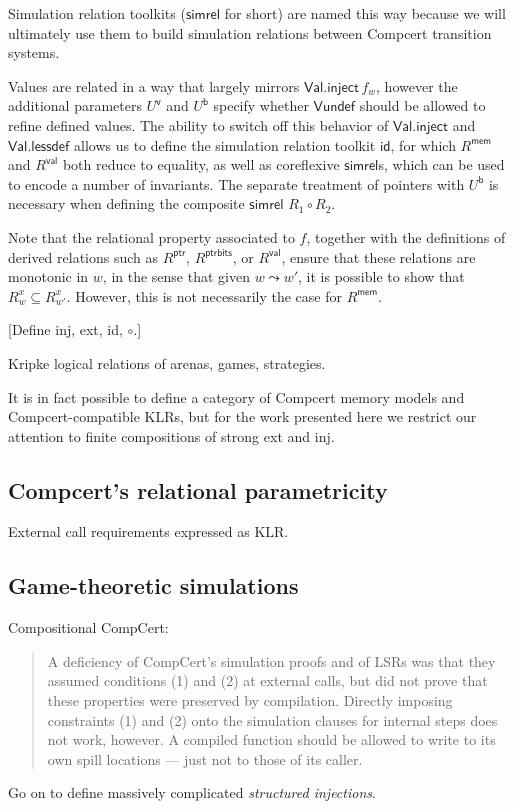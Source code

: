 \documentclass[acmsmall,anonymous,review]{acmart}
\newcommand{\kw}[1]{\ensuremath{ \textsf{#1} }}
\begin{document}
Simulation relation toolkits (\kw{simrel} for short)
are named this way because we will ultimately
use them to build simulation relations between
Compcert transition systems.

Values are related in a way that largely mirrors $\kw{Val.inject}\,f_w$,
however the additional parameters $U^\kw{v}$ and $U^\kw{b}$
specify whether $\kw{Vundef}$ should be allowed to refine defined values.
The ability to switch off this behavior of \kw{Val.inject} and \kw{Val.lessdef}
allows us to define the simulation relation toolkit \kw{id},
for which $R^\kw{mem}$ and $R^\kw{val}$ both reduce to equality,
as well as coreflexive \kw{simrel}s,
which can be used to encode a number of invariants.
The separate treatment of pointers with $U^\kw{b}$
is necessary when defining the composite \kw{simrel} $R_1 \circ R_2$.

Note that the relational property associated to $f$,
together with the definitions of
derived relations such as $R^\kw{ptr}$, $R^\kw{ptrbits}$, or $R^\kw{val}$,
ensure that these relations are monotonic in $w$,
in the sense that given $w \leadsto w'$,
it is possible to show that $R^x_w \subseteq R^x_{w'}$.
However,
this is not necessarily the case for $R^\kw{mem}$.



[Define inj, ext, id, $\circ$.]


Kripke logical relations of arenas, games, strategies.

It is in fact possible to define a
category of Compcert memory models and Compcert-compatible KLRs,
but for the work presented here we restrict our attention
to finite compositions of strong \textsf{ext} and \textsf{inj}.


\subsection{Compcert's relational parametricity} %

External call requirements expressed as KLR.


\subsection{Game-theoretic simulations} %

Compositional CompCert:
\begin{quote}
A deficiency of CompCert’s simulation proofs and of LSRs
was that they assumed conditions (1) and (2) at external calls,
but did not prove that these properties were preserved by compilation.
Directly imposing constraints (1) and (2)
onto the simulation clauses for internal steps does not work, however.
A compiled function should be allowed to
write to its own spill locations ---
just not to those of its caller.
\end{quote}
Go on to define massively complicated \emph{structured injections}.
\end{document}
